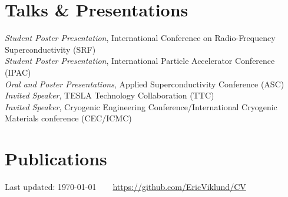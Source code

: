 \documentclass[11pt]{article} %
\begin{document}

\section*{Talks \& Presentations}

\emph{Student Poster Presentation}, International Conference on Radio-Frequency Superconductivity (SRF)\\
\emph{Student Poster Presentation}, International Particle Accelerator Conference (IPAC)\\
\emph{Oral and Poster Presentations}, Applied Superconductivity Conference (ASC)\\
\emph{Invited Speaker}, TESLA Technology Collaboration (TTC)\\
\emph{Invited Speaker}, Cryogenic Engineering Conference/International Cryogenic Materials conference (CEC/ICMC)

\section*{Publications}

\nocite{*}
\printbibliography[heading=none]




\begin{center}
	\scriptsize
	Last updated: \today~~\raisebox{-0.5pt}{\textbullet}~~\href{https://github.com/EricViklund/CV}{https://github.com/EricViklund/CV}
\end{center}

\end{document}
